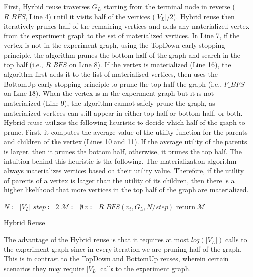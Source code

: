 First, Hyrbid reuse traverses $G_L$ starting from the terminal node in reverse ($R\_BFS$, Line 4) until it visits half of the vertices ($|V_L|/2$).
Hybrid reuse then iteratively prunes half of the remaining vertices and adds any materialized vertex from the experiment graph to the set of materialized vertices.
In Line 7, if the vertex is not in the experiment graph, using the TopDown early-stopping principle, the algorithm prunes the bottom half of the graph and search in the top half (i.e., $R\_BFS$ on Line 8).
If the vertex is materialized (Line 16), the algorithm first adds it to the list of materialized vertices, then uses the BottomUp early-stopping principle to prune the top half the graph (i.e., $F\_BFS$ on Line 18).
When the vertex is in the experiment graph but it is not materialized (Line 9), the algorithm cannot safely prune the graph, as materialized vertices can still appear in either top half or bottom half, or both.
Hybrid reuse utilizes the following heuristic to decide which half of the graph to prune.
First, it computes the average value of the utility function for the parents and children of the vertex (Lines 10 and 11).
If the average utility of the parents is larger, then it prunes the bottom half, otherwise, it prunes the top half.
The intuition behind this heuristic is the following.
The materialization algorithm always materializes vertices based on their utility value.
Therefore, if the utility of parents of a vertex is larger than the utility of its children, then there is a higher likelihood that more vertices in the top half of the graph are materialized.

\begin{algorithm}[h]
$N \coloneqq |V_L|$\;
$step \coloneqq 2$\;
$\mathcal{M} \coloneqq \emptyset$\;
$v \coloneqq R\_BFS(v_t, G_L, N/step)$\;
return $\mathcal{M}$\;
\caption{Hybrid Reuse}\label{algorithm-hybrid}
\end{algorithm}
The advantage of the Hybrid reuse is that it requires at most $log(|V_L|)$ calls to the experiment graph since in every iteration we are pruning half of the graph.
This is in contrast to the TopDown and BottomUp reuses, wherein certain scenarios they may require $|V_L|$ calls to the experiment graph.

